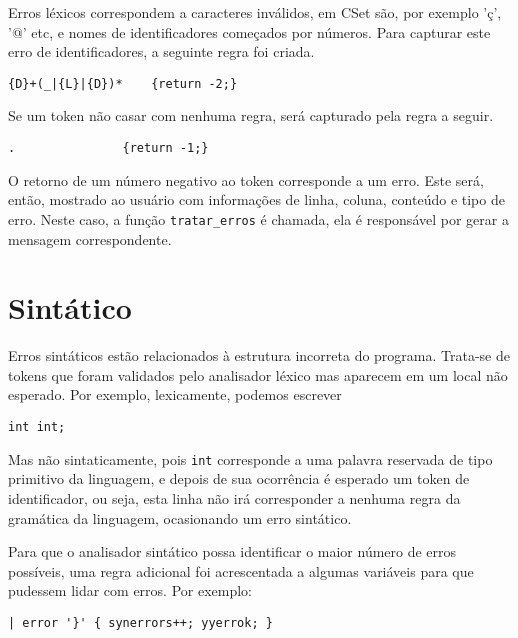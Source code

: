 \documentclass[12pt]{article}
\begin{document}
Erros léxicos correspondem a caracteres inválidos, em CSet são, por exemplo 'ç', '@' etc, e nomes de identificadores começados por números. Para capturar este erro de identificadores, a seguinte regra foi criada.

\begin{verbatim}
{D}+(_|{L}|{D})*	{return -2;}
\end{verbatim}

Se um token não casar com nenhuma regra, será capturado pela regra a seguir.

\begin{verbatim}
.				{return -1;}
\end{verbatim}

O retorno de um número negativo ao token corresponde a um erro. Este será, então, mostrado ao usuário com informações de linha, coluna, conteúdo e tipo de erro. Neste caso, a função \texttt{tratar\_erros} é chamada, ela é responsável por gerar a mensagem correspondente.


\section{Sintático}

Erros sintáticos estão relacionados à estrutura incorreta do programa. Trata-se de tokens que foram validados pelo analisador léxico mas aparecem em um local não esperado. Por exemplo, lexicamente, podemos escrever

\texttt{int int;}

Mas não sintaticamente, pois \texttt{int} corresponde a uma palavra reservada de tipo primitivo da linguagem, e depois de sua ocorrência é esperado um token de identificador, ou seja, esta linha não irá corresponder a nenhuma regra da gramática da linguagem, ocasionando um erro sintático.

Para que o analisador sintático possa identificar o maior número de erros possíveis, uma regra adicional foi acrescentada a algumas variáveis para que pudessem lidar com erros. Por exemplo:
 	
\begin{verbatim}
| error '}' { synerrors++; yyerrok; } 
\end{verbatim}
\end{document}
